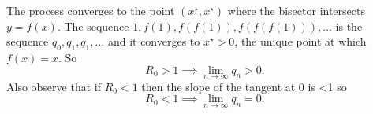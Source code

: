 \documentclass[a4paper,9pt]{extarticle}
\begin{document}
\begin{multicols*}{2}
\begin{figure}[H]
		\label{fig:screenshot008}
	\end{figure}
	The process converges to the point $(x^{\star},x^{\star})$ where the bisector intersects $y=f(x)$. The sequence $1,f(1),f(f(1)),f(f(f(1))),\ldots$ is the sequence $q_{0},q_{1},q_{1},\ldots$ and it converges to $x^{\star}>0$, the unique point at which $f(x)=x$. So
	\begin{equation*}
		R_{0}>1\implies\lim_{n\to\infty}q_{n}>0.
	\end{equation*}
	Also observe that if $R_{0}<1$ then the slope of the tangent at 0 is <1 so
	\begin{equation*}
		R_{0}<1\implies\lim_{n\to\infty}q_{n}=0.
	\end{equation*}
	\end{multicols*}
\end{document}
